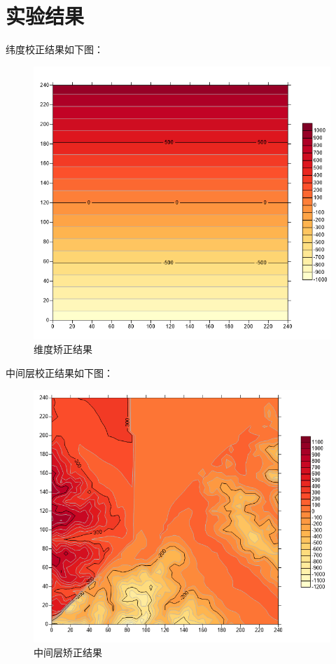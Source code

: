 \section{实验结果}
纬度校正结果如下图：
\begin{figure}[H]
	\centering
	\includegraphics[scale = 0.85]{figures/g_phi.png}
	\caption{维度矫正结果}
\end{figure}

中间层校正结果如下图：
\begin{figure}[H]
	\centering
	\includegraphics[scale = 0.85]{figures/g_m.png}
	\caption{中间层矫正结果}
\end{figure}

